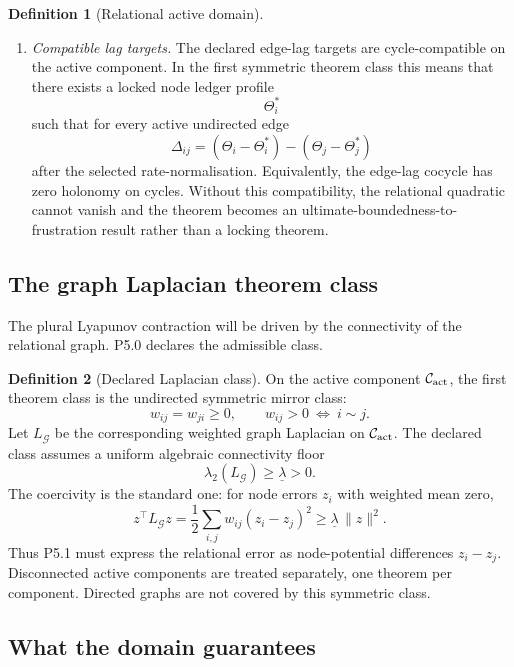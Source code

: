\documentclass[11pt,a4paper]{article}
\theoremstyle{definition}
\newtheorem{definition}{Definition}[section]
\theoremstyle{plain}
\theoremstyle{remark}
\begin{document}
\begin{definition}[Relational active domain]
\begin{enumerate}[label=\textup{(\arabic*)},leftmargin=1.2cm]
\item \emph{Compatible lag targets.}
The declared edge-lag targets are cycle-compatible on the active component. In the
first symmetric theorem class this means that there exists a locked node ledger
profile
\[
\Theta_i^*
\]
such that for every active undirected edge
\[
\Delta_{ij}
=
(\Theta_i-\Theta_i^*)-(\Theta_j-\Theta_j^*)
\]
after the selected rate-normalisation. Equivalently, the edge-lag cocycle has zero
holonomy on cycles. Without this compatibility, the relational quadratic cannot
vanish and the theorem becomes an ultimate-boundedness-to-frustration result
rather than a locking theorem.
\end{enumerate}
\end{definition}

\subsection{The graph Laplacian theorem class}

The plural Lyapunov contraction will be driven by the connectivity of the relational graph.
P5.0 declares the admissible class.

\begin{definition}[Declared Laplacian class]\label{def:laplacian}
On the active component \(\mathcal C_{\rm act}\), the first theorem class is the
undirected symmetric mirror class:
\[
w_{ij}=w_{ji}\ge0,
\qquad
w_{ij}>0\ \Longleftrightarrow\ i\sim j.
\]
Let \(L_{\mathcal G}\) be the corresponding weighted graph Laplacian on
\(\mathcal C_{\rm act}\). The declared class assumes a uniform algebraic
connectivity floor
\[
\boxed{\;
\lambda_2(L_{\mathcal G})\ge\underline\lambda>0.
\;}
\]
The coercivity is the standard one: for node errors \(z_i\) with weighted mean zero,
\[
z^\top L_{\mathcal G}z
=
\frac12\sum_{i,j}w_{ij}(z_i-z_j)^2
\ge
\underline\lambda\,\lVert z\rVert^2.
\]
Thus P5.1 must express the relational error as node-potential differences
\(z_i-z_j\). Disconnected active components are treated separately, one theorem
per component. Directed graphs are not covered by this symmetric class.
\end{definition}

\subsection{What the domain guarantees}
\end{document}
